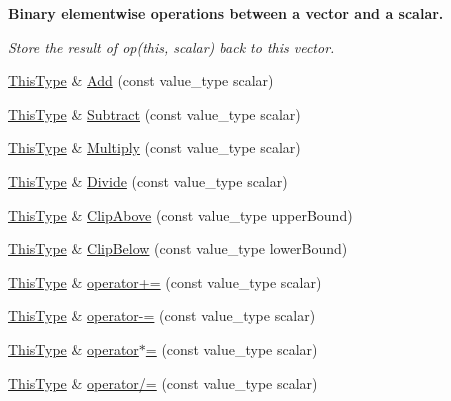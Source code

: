 \begin{Indent}{\bf Binary elementwise operations between a vector and a scalar.}\par
{\em Store the result of op(this, scalar) back to this vector. }\begin{DoxyCompactItemize}
\item 
\hyperlink{classvct_fixed_size_const_vector_base_a071063bc4fa43112cc287b2dbef53180}{This\+Type} \& \hyperlink{classvct_fixed_size_vector_base_af454b994920e2316f301e2fa5d751a12}{Add} (const value\+\_\+type scalar)
\item 
\hyperlink{classvct_fixed_size_const_vector_base_a071063bc4fa43112cc287b2dbef53180}{This\+Type} \& \hyperlink{classvct_fixed_size_vector_base_a823e5452eb0ce0498c1e00e9d575130f}{Subtract} (const value\+\_\+type scalar)
\item 
\hyperlink{classvct_fixed_size_const_vector_base_a071063bc4fa43112cc287b2dbef53180}{This\+Type} \& \hyperlink{classvct_fixed_size_vector_base_a458bd13f44fc4feefacdb095c892a117}{Multiply} (const value\+\_\+type scalar)
\item 
\hyperlink{classvct_fixed_size_const_vector_base_a071063bc4fa43112cc287b2dbef53180}{This\+Type} \& \hyperlink{classvct_fixed_size_vector_base_a198e711d14a4beea8ceb22bf9e95d4b9}{Divide} (const value\+\_\+type scalar)
\item 
\hyperlink{classvct_fixed_size_const_vector_base_a071063bc4fa43112cc287b2dbef53180}{This\+Type} \& \hyperlink{classvct_fixed_size_vector_base_a18fbb50c4b6f6312414250df67219ff0}{Clip\+Above} (const value\+\_\+type upper\+Bound)
\item 
\hyperlink{classvct_fixed_size_const_vector_base_a071063bc4fa43112cc287b2dbef53180}{This\+Type} \& \hyperlink{classvct_fixed_size_vector_base_a89cbd6554bb463ab106c245af55e5c17}{Clip\+Below} (const value\+\_\+type lower\+Bound)
\item 
\hyperlink{classvct_fixed_size_const_vector_base_a071063bc4fa43112cc287b2dbef53180}{This\+Type} \& \hyperlink{classvct_fixed_size_vector_base_ab76c0b091397a505293c61e25aa61508}{operator+=} (const value\+\_\+type scalar)
\item 
\hyperlink{classvct_fixed_size_const_vector_base_a071063bc4fa43112cc287b2dbef53180}{This\+Type} \& \hyperlink{classvct_fixed_size_vector_base_a15f566ac5136ad4ce72d95474d6024a3}{operator-\/=} (const value\+\_\+type scalar)
\item 
\hyperlink{classvct_fixed_size_const_vector_base_a071063bc4fa43112cc287b2dbef53180}{This\+Type} \& \hyperlink{classvct_fixed_size_vector_base_abbbb553f2bbecb7242da73c935214544}{operator$\ast$=} (const value\+\_\+type scalar)
\item 
\hyperlink{classvct_fixed_size_const_vector_base_a071063bc4fa43112cc287b2dbef53180}{This\+Type} \& \hyperlink{classvct_fixed_size_vector_base_acbd59665ba83f10e7ac127edfb871073}{operator/=} (const value\+\_\+type scalar)
\end{DoxyCompactItemize}
\end{Indent}
